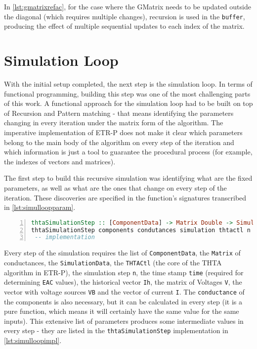 In \cref{lst:gmatrixrefac}, for the case where the GMatrix needs to be updated outside the diagonal (which requires multiple changes), recursion is used in the \lstinline!buffer!, producing the effect of multiple sequential updates to each index of the matrix.


\section{ Simulation Loop }

With the initial setup completed, the next step is the simulation loop. In terms of functional programming, building this step was one of the most challenging parts of this work. A functional approach for the simulation loop had to be built on top of Recursion and Pattern matching - that means identifying the parameters changing in every iteration under the matrix form of the algorithm. The imperative implementation of ETR-P does not make it clear which parameters belong to the main body of the algorithm on every step of the iteration and which information is just a tool to guarantee the procedural process (for example, the indexes of vectors and matrices).

The first step to build this recursive simulation was identifying what are the fixed parameters, as well as what are the ones that change on every step of the iteration. These discoveries are specified in the function's signatures transcribed in \cref{lst:simulloopparam}.

\begin{lstlisting}[language=Haskell, numbers=left, caption={Building the simulation loop - parameter identification}, captionpos=b, label={lst:simulloopparam}]
thtaSimulationStep :: [ComponentData] -> Matrix Double -> SimulationData -> Int -> Int -> Double  -> Vector Double -> Matrix Double -> Vector Double -> Vector Double -> SimulationResults
thtaSimulationStep components condutances simulation thtactl n time ih vMatrix vbVector iVector =
 -- implementation
\end{lstlisting}

Every step of the simulation requires the list of \lstinline!ComponentData!, the \lstinline!Matrix! of conductances, the \lstinline!SimulationData!, the \lstinline!THTACtl! (the core of the THTA algorithm in ETR-P),  the simulation step \lstinline!n!, the time stamp \lstinline!time! (required for determining \lstinline!EAC! values), the historical vector \lstinline!Ih!, the matrix of Voltages \lstinline!V!, the vector with voltage sources \lstinline!VB! and the vector of current \lstinline!I!. The \lstinline!conductance! of the components is also necessary, but it can be calculated in every step (it is a pure function, which means it will certainly have the same value for the same inputs). This extensive list of parameters produces some intermediate values in every step - they are listed in the \lstinline!thtaSimulationStep! implementation in \cref{lst:simulloopimpl}.


